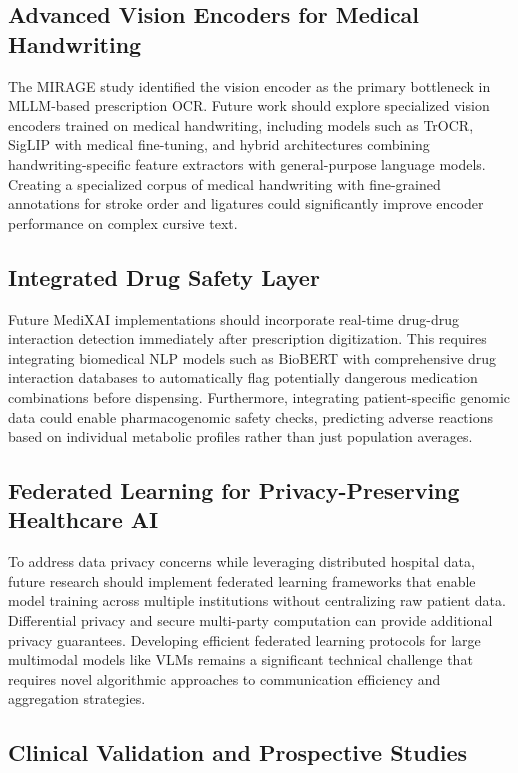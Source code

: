 \documentclass[conference]{IEEEtran}
\begin{document}
\subsection{Advanced Vision Encoders for Medical Handwriting}

The MIRAGE study \cite{mankash2024mirage} identified the vision encoder as the primary bottleneck in MLLM-based prescription OCR. Future work should explore specialized vision encoders trained on medical handwriting, including models such as TrOCR, SigLIP with medical fine-tuning, and hybrid architectures combining handwriting-specific feature extractors with general-purpose language models. Creating a specialized corpus of medical handwriting with fine-grained annotations for stroke order and ligatures could significantly improve encoder performance on complex cursive text.

\subsection{Integrated Drug Safety Layer}

Future MediXAI implementations should incorporate real-time drug-drug interaction detection immediately after prescription digitization. This requires integrating biomedical NLP models such as BioBERT with comprehensive drug interaction databases to automatically flag potentially dangerous medication combinations before dispensing. Furthermore, integrating patient-specific genomic data could enable pharmacogenomic safety checks, predicting adverse reactions based on individual metabolic profiles rather than just population averages.

\subsection{Federated Learning for Privacy-Preserving Healthcare AI}

To address data privacy concerns while leveraging distributed hospital data, future research should implement federated learning frameworks that enable model training across multiple institutions without centralizing raw patient data. Differential privacy and secure multi-party computation can provide additional privacy guarantees. Developing efficient federated learning protocols for large multimodal models like VLMs remains a significant technical challenge that requires novel algorithmic approaches to communication efficiency and aggregation strategies.

\subsection{Clinical Validation and Prospective Studies}
\end{document}
